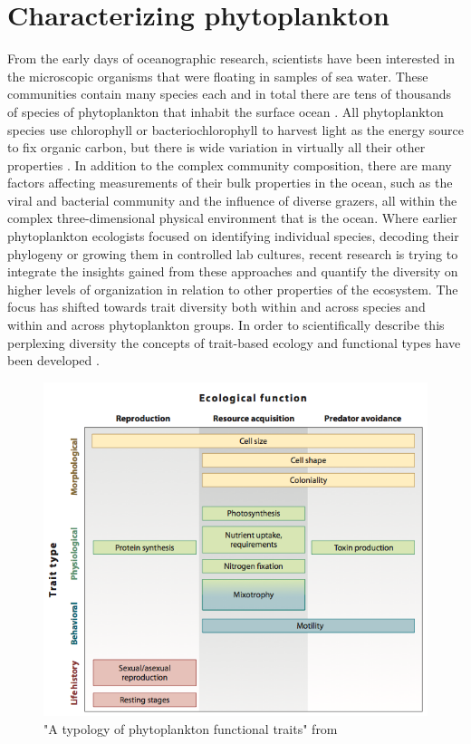 \section{Characterizing phytoplankton}
From the early days of oceanographic research, scientists have been interested in the microscopic organisms that were floating in samples of sea water. These communities contain many species each and in total there are tens of thousands of species of phytoplankton that inhabit the surface ocean \citep{Engelen2015}. All phytoplankton species use chlorophyll or bacteriochlorophyll to harvest light as the energy source to fix organic carbon, but there is wide variation in virtually all their other properties \citep{Litchman2008}. In addition to the complex community composition, there are many factors affecting measurements of their bulk properties in the ocean, such as the viral and bacterial community and the influence of diverse grazers, all within the complex three-dimensional physical environment that is the ocean. 
Where earlier phytoplankton ecologists focused on identifying individual species, decoding their phylogeny or growing them in controlled lab cultures, recent research is trying to integrate the insights gained from these approaches and quantify the diversity on higher levels of organization in relation to other properties of the ecosystem. The focus has shifted towards trait diversity both within and across species and within and across phytoplankton groups. In order to scientifically describe this perplexing diversity the concepts of trait-based ecology and functional types have been developed \citep{Tilman2001,McGill2006,Violle2007c}.

\begin{figure}
\centering
\includegraphics[width=0.7\linewidth]{./Chp1-Intro/Fig_litchman2008.png}
\caption[Scheme]{\small{"A typology of phytoplankton functional traits" from \cite{Litchman2008}}}
\label{PhytoTraits}
\end{figure}

